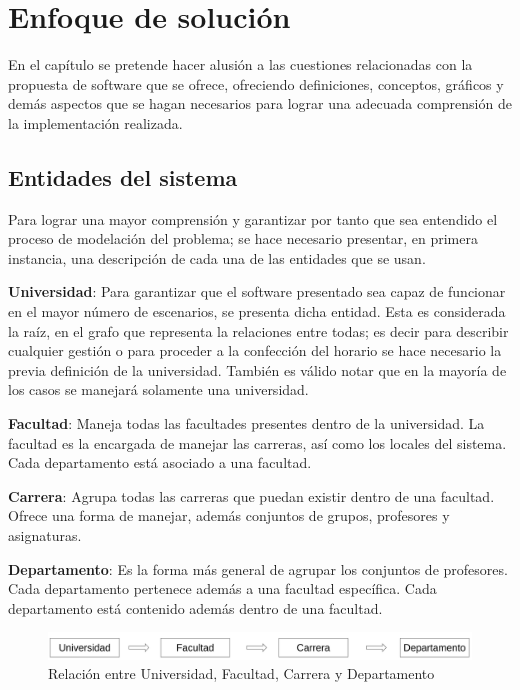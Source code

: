 \chapter{Enfoque de solución}

En el capítulo se pretende hacer alusión a las cuestiones relacionadas con la propuesta de software que se ofrece, ofreciendo definiciones, conceptos, gráficos y demás aspectos que se hagan necesarios para lograr una adecuada comprensión de la implementación realizada.

\section{Entidades del sistema}

Para lograr una mayor comprensión y garantizar por tanto que sea entendido el proceso de modelación del problema; se hace necesario presentar, en primera instancia, una descripción de cada una de las entidades que se usan.

\textbf{Universidad}: Para garantizar que el software presentado sea capaz de funcionar en el mayor número de escenarios, se presenta dicha entidad. Esta es considerada la raíz, en el grafo que representa la relaciones entre todas; es decir para describir cualquier gestión o para proceder a la confección del horario se hace necesario la previa definición de la universidad. También es válido notar que en la mayoría de los casos se manejará solamente  una universidad.

\textbf{Facultad}: Maneja todas las facultades presentes dentro de la universidad. La facultad es la encargada de manejar las carreras, así como los locales del sistema. Cada departamento está asociado a una facultad.

\textbf{Carrera}: Agrupa todas las carreras que puedan existir dentro de una facultad. Ofrece una forma de manejar, además conjuntos de grupos, profesores y asignaturas.

\textbf{Departamento}: Es la forma más general de agrupar los conjuntos de profesores. Cada departamento pertenece además a una facultad específica. Cada departamento está contenido además dentro de una facultad.

\begin{figure}[h!]
	\centering
	\includegraphics[width=1\linewidth]{images/Chapter 2/department_relation}
	\caption{Relación entre Universidad, Facultad, Carrera y Departamento}
	\label{fig:department_relation}
\end{figure}

